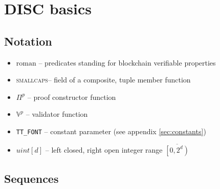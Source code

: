 
\section{DISC basics}\label{sec:appendix-disc}
\subsection{Notation}

\begin{itemize}[noitemsep]
    \item  $\mathrm{roman}$ -- predicates standing for blockchain verifiable properties 
    \item \textsc{smallcaps}-- field of a composite, tuple member function
    \item $\Pi^p$ -- proof constructor function
    \item $\mathbb{V}^p$ -- validator function
    \item \texttt{TT\_FONT} -- constant parameter (see appendix \ref{sec:constants})
    \item $\mathit{uint}[d]$ -- left closed, right open integer range $\overline{\left[0,2^d\right)}$
\end{itemize}


\subsection{Sequences}
 
